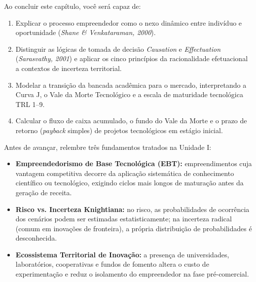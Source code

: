 \begin{capObjetivos}
  Ao concluir este capítulo, você será capaz de:
  \begin{enumerate}[leftmargin=1.5em, itemsep=2pt]
    \item Explicar o processo empreendedor como o nexo dinâmico entre indivíduo e oportunidade (\textit{Shane \& Venkataraman, 2000}).
    \item Distinguir as lógicas de tomada de decisão \textit{Causation} e \textit{Effectuation} (\textit{Sarasvathy, 2001}) e aplicar os cinco princípios da racionalidade efetuacional a contextos de incerteza territorial.
    \item Modelar a transição da bancada acadêmica para o mercado, interpretando a Curva J, o Vale da Morte Tecnológico e a escala de maturidade tecnológica TRL 1–9.
    \item Calcular o fluxo de caixa acumulado, o fundo do Vale da Morte e o prazo de retorno (\textit{payback} simples) de projetos tecnológicos em estágio inicial.
  \end{enumerate}
\end{capObjetivos}

\begin{capRevisao}
  Antes de avançar, relembre três fundamentos tratados na Unidade I:
  \begin{itemize}[leftmargin=1.5em, itemsep=2pt]
    \item \textbf{Empreendedorismo de Base Tecnológica (EBT):} empreendimentos cuja vantagem competitiva decorre da aplicação sistemática de conhecimento científico ou tecnológico, exigindo ciclos mais longos de maturação antes da geração de receita.
    \item \textbf{Risco vs. Incerteza Knightiana:} no risco, as probabilidades de ocorrência dos cenários podem ser estimadas estatisticamente; na incerteza radical (comum em inovações de fronteira), a própria distribuição de probabilidades é desconhecida.
    \item \textbf{Ecossistema Territorial de Inovação:} a presença de universidades, laboratórios, cooperativas e fundos de fomento altera o custo de experimentação e reduz o isolamento do empreendedor na fase pré-comercial.
  \end{itemize}
\end{capRevisao}


